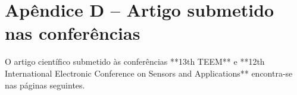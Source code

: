 \chapter{Apêndice D – Artigo submetido nas conferências}

O artigo científico submetido às conferências **13th TEEM** e **12th International Electronic Conference on Sensors and Applications** encontra-se nas páginas seguintes.


